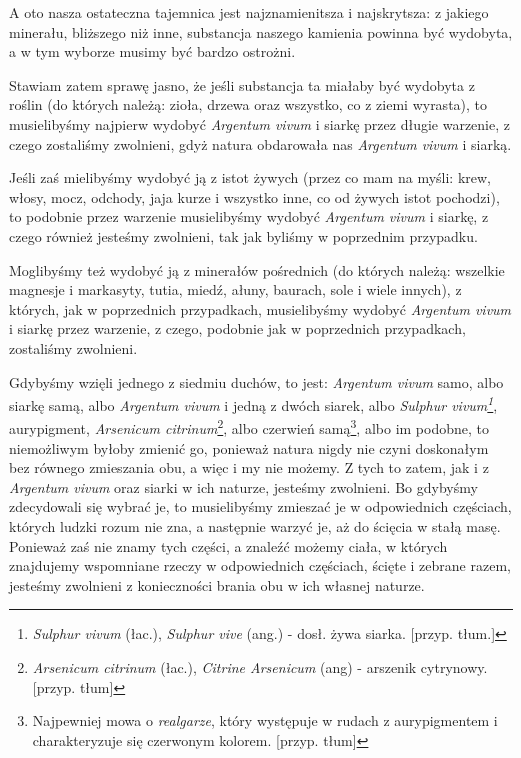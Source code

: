 A oto nasza ostateczna tajemnica jest najznamienitsza i najskrytsza: z jakiego minerału, bliższego niż inne, substancja naszego kamienia powinna być wydobyta, a w tym wyborze musimy być bardzo ostrożni. 

Stawiam zatem sprawę jasno, że jeśli substancja ta miałaby być wydobyta z roślin (do których należą: zioła, drzewa oraz wszystko, co z ziemi wyrasta), to musielibyśmy najpierw wydobyć \textit{Argentum vivum} i siarkę przez długie warzenie, z czego zostaliśmy zwolnieni, gdyż natura obdarowała nas \textit{Argentum vivum} i siarką. 

Jeśli zaś mielibyśmy wydobyć ją z istot żywych (przez co mam na myśli: krew, włosy, mocz, odchody, jaja kurze i wszystko inne, co od żywych istot pochodzi), to podobnie przez warzenie musielibyśmy wydobyć \textit{Argentum vivum} i siarkę, z czego również jesteśmy zwolnieni, tak jak byliśmy w poprzednim przypadku.

Moglibyśmy też wydobyć ją z minerałów pośrednich (do których należą: wszelkie magnesje i markasyty, tutia, miedź, ałuny, baurach, sole i wiele innych), z których, jak w poprzednich przypadkach, musielibyśmy wydobyć \textit{Argentum vivum} i siarkę przez warzenie, z czego, podobnie jak w poprzednich przypadkach, zostaliśmy zwolnieni. 


Gdybyśmy wzięli jednego z siedmiu duchów, to jest: \textit{Argentum vivum} samo, albo siarkę samą, albo \textit{Argentum vivum} i jedną z dwóch siarek, albo \textit{Sulphur vivum\footnote{\textit{Sulphur vivum} (łac.), \textit{Sulphur vive} (ang.) - dosł. żywa siarka. [przyp. tłum.]}}, aurypigment, \textit{Arsenicum citrinum}\footnote{\textit{Arsenicum citrinum} (łac.), \textit{Citrine Arsenicum} (ang) - arszenik cytrynowy. [przyp. tłum]}, albo czerwień samą\footnote{Najpewniej mowa o \textit{realgarze}, który występuje w rudach z aurypigmentem i charakteryzuje się czerwonym kolorem. [przyp. tłum]}, albo im podobne, to niemożliwym byłoby zmienić go, ponieważ natura nigdy nie czyni doskonałym bez równego zmieszania obu, a więc i my nie możemy. Z tych to zatem, jak i z \textit{Argentum vivum} oraz siarki w ich naturze, jesteśmy zwolnieni. Bo gdybyśmy zdecydowali się wybrać je, to musielibyśmy zmieszać je w odpowiednich częściach, których ludzki rozum nie zna, a następnie warzyć je, aż do ścięcia w stałą masę. Ponieważ zaś nie znamy tych części, a znaleźć możemy ciała, w których znajdujemy wspomniane rzeczy w odpowiednich częściach, ścięte i zebrane razem, jesteśmy zwolnieni z konieczności brania obu w ich własnej naturze.

